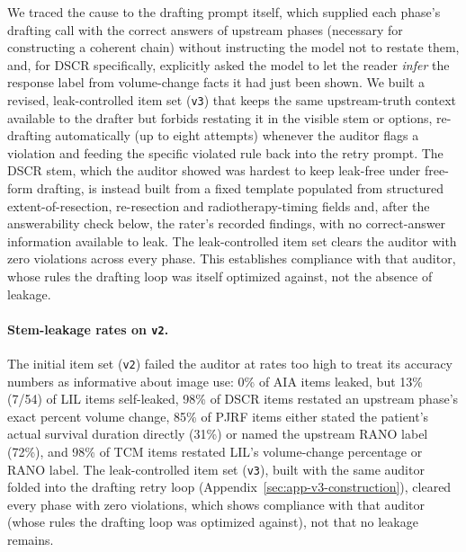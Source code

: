 \documentclass[11pt]{article}
\begin{document}
We traced the cause to the drafting prompt itself, which supplied each phase's drafting call with the correct answers of upstream phases (necessary for constructing a coherent chain) without instructing the model not to restate them, and, for DSCR specifically, explicitly asked the model to let the reader \emph{infer} the response label from volume-change facts it had just been shown. We built a revised, leak-controlled item set (\texttt{v3}) that keeps the same upstream-truth context available to the drafter but forbids restating it in the visible stem or options, re-drafting automatically (up to eight attempts) whenever the auditor flags a violation and feeding the specific violated rule back into the retry prompt. The DSCR stem, which the auditor showed was hardest to keep leak-free under free-form drafting, is instead built from a fixed template populated from structured extent-of-resection, re-resection and radiotherapy-timing fields and, after the answerability check below, the rater\textquoteright s recorded findings, with no correct-answer information available to leak. The leak-controlled item set clears the auditor with zero violations across every phase. This establishes compliance with that auditor, whose rules the drafting loop was itself optimized against, not the absence of leakage.


\paragraph{Stem-leakage rates on \texttt{v2}.} The initial item set (\texttt{v2}) failed the auditor at rates too high to treat its accuracy numbers as informative about image use: 0\% of AIA items leaked, but 13\% (7/54) of LIL items self-leaked, 98\% of DSCR items restated an upstream phase's exact percent volume change, 85\% of PJRF items either stated the patient's actual survival duration directly (31\%) or named the upstream RANO label (72\%), and 98\% of TCM items restated LIL's volume-change percentage or RANO label. The leak-controlled item set (\texttt{v3}), built with the same auditor folded into the drafting retry loop (Appendix~\ref{sec:app-v3-construction}), cleared every phase with zero violations, which shows compliance with that auditor (whose rules the drafting loop was optimized against), not that no leakage remains.
\end{document}
